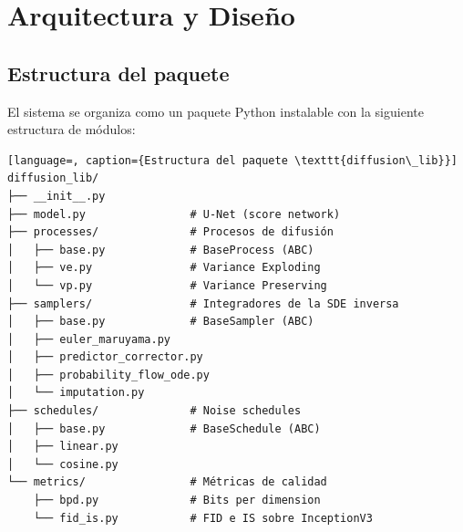 
\section{Arquitectura y Diseño}
\label{sec:arquitectura}

\subsection{Estructura del paquete}
\label{sec:estructura-paquete}

El sistema se organiza como un paquete Python instalable con la siguiente
estructura de módulos:

\begin{lstlisting}[language=, caption={Estructura del paquete \texttt{diffusion\_lib}}]
diffusion_lib/
├── __init__.py
├── model.py                # U-Net (score network)
├── processes/              # Procesos de difusión
│   ├── base.py             # BaseProcess (ABC)
│   ├── ve.py               # Variance Exploding
│   └── vp.py               # Variance Preserving
├── samplers/               # Integradores de la SDE inversa
│   ├── base.py             # BaseSampler (ABC)
│   ├── euler_maruyama.py
│   ├── predictor_corrector.py
│   ├── probability_flow_ode.py
│   └── imputation.py
├── schedules/              # Noise schedules
│   ├── base.py             # BaseSchedule (ABC)
│   ├── linear.py
│   └── cosine.py
└── metrics/                # Métricas de calidad
    ├── bpd.py              # Bits per dimension
    └── fid_is.py           # FID e IS sobre InceptionV3
\end{lstlisting}

